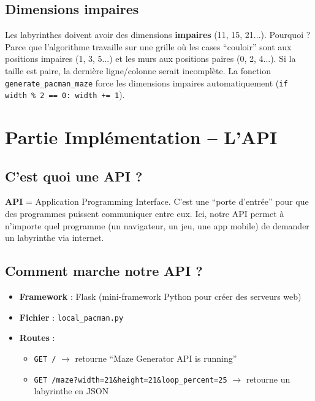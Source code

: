 \documentclass[12pt,a4paper]{article}
\begin{document}
\subsection{Dimensions impaires}

Les labyrinthes doivent avoir des dimensions \textbf{impaires} (11, 15, 21...). Pourquoi ? Parce que l'algorithme travaille sur une grille où les cases ``couloir'' sont aux positions impaires (1, 3, 5...) et les murs aux positions paires (0, 2, 4...). Si la taille est paire, la dernière ligne/colonne serait incomplète. La fonction \texttt{generate\_pacman\_maze} force les dimensions impaires automatiquement (\texttt{if width \% 2 == 0: width += 1}).

\section{Partie Implémentation -- L'API}

\subsection{C'est quoi une API ?}

\begin{definitionbox}
\textbf{API} = Application Programming Interface. C'est une ``porte d'entrée'' pour que des programmes puissent communiquer entre eux. Ici, notre API permet à n'importe quel programme (un navigateur, un jeu, une app mobile) de demander un labyrinthe via internet.
\end{definitionbox}

\subsection{Comment marche notre API ?}

\begin{itemize}
    \item \textbf{Framework} : Flask (mini-framework Python pour créer des serveurs web)
    \item \textbf{Fichier} : \texttt{local_pacman.py}
    \item \textbf{Routes} :
    \begin{itemize}
        \item \texttt{GET /} $\rightarrow$ retourne ``Maze Generator API is running''
        \item \texttt{GET /maze?width=21\&height=21\&loop\_percent=25} $\rightarrow$ retourne un labyrinthe en JSON
    \end{itemize}
\end{itemize}
\end{document}

